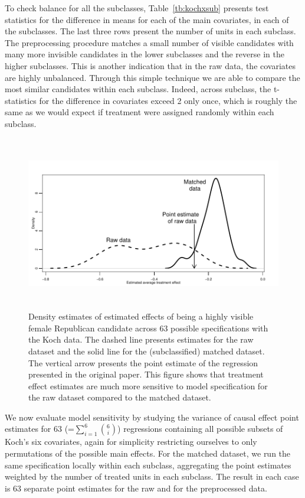 \documentclass[11pt,titlepage]{article}
\begin{document}
To check balance for all the subclasses, Table~\ref{tb:kochxsub}
presents test statistics for the difference in means for each of the
main covariates, in each of the subclasses.  The last three rows
present the number of units in each subclass.  The preprocessing
procedure matches a small number of visible candidates with many more
invisible candidates in the lower subclasses and the reverse in the
higher subclasses.  This is another indication that in the raw data,
the covariates are highly unbalanced.  Through this simple technique
we are able to compare the most similar candidates within each
subclass.  Indeed, across subclass, the t-statistics for the
difference in covariates exceed 2 only once, which is roughly the same
as we would expect if treatment were assigned randomly within each
subclass.

\begin{figure}[t] 
 \begin{center}
   \includegraphics[height=3in,angle=0]{figs/kochdens.pdf}
 \end{center} 
 \vspace{-0.275in}
 \caption{Density estimates of estimated effects of
   being a highly visible female Republican candidate across 63
   possible specifications with the Koch data.  The dashed line
   presents estimates for the raw dataset and the solid line for the
   (subclassified) matched dataset.  The vertical arrow presents the
   point estimate of the regression presented in the original paper.
   This figure shows that treatment effect estimates are much more
   sensitive to model specification for the raw dataset compared to
   the matched dataset.}
 \label{fg:kochdens}
\end{figure}

We now evaluate model sensitivity by studying the variance of causal
effect point estimates for 63 (=$\sum_{i=1}^6 {6 \choose i}$)
regressions containing all possible subsets of Koch's six covariates,
again for simplicity restricting ourselves to only permutations of the
possible main effects.  For the matched dataset, we run the same
specification locally within each subclass, aggregating the point
estimates weighted by the number of treated units in each subclass.
The result in each case is 63 separate point estimates for the raw and
for the preprocessed data.
\end{document}

